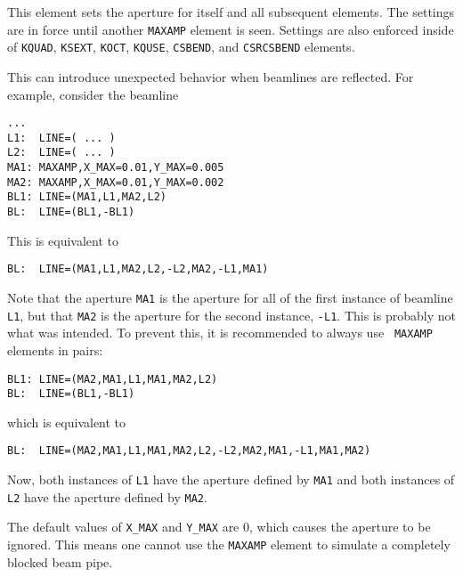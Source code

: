 This element sets the aperture for itself and all subsequent elements.
The settings are in force until another {\tt MAXAMP} element is seen.
Settings are also enforced inside of \verb|KQUAD|, \verb|KSEXT|, \verb|KOCT|, \verb|KQUSE|, \verb|CSBEND|, and \verb|CSRCSBEND| elements.

This can introduce unexpected behavior when beamlines are reflected.
For example, consider the beamline
\begin{verbatim}
...
L1:  LINE=( ... )
L2:  LINE=( ... )
MA1: MAXAMP,X_MAX=0.01,Y_MAX=0.005
MA2: MAXAMP,X_MAX=0.01,Y_MAX=0.002
BL1: LINE=(MA1,L1,MA2,L2)
BL:  LINE=(BL1,-BL1)
\end{verbatim}

This is equivalent to
\begin{verbatim}
BL:  LINE=(MA1,L1,MA2,L2,-L2,MA2,-L1,MA1)
\end{verbatim}
Note that the aperture {\tt MA1} is the aperture for all of the first
instance of beamline {\tt L1}, but that {\tt MA2} is the aperture for
the second instance, {\tt -L1}.  This is probably not what was
intended.  To prevent this, it is recommended to always use {\tt
MAXAMP} elements in pairs:
\begin{verbatim}
BL1: LINE=(MA2,MA1,L1,MA1,MA2,L2)
BL:  LINE=(BL1,-BL1)
\end{verbatim}
which is equivalent to
\begin{verbatim}
BL:  LINE=(MA2,MA1,L1,MA1,MA2,L2,-L2,MA2,MA1,-L1,MA1,MA2)
\end{verbatim}
Now, both instances of {\tt L1} have the aperture defined by 
{\tt MA1} and both instances of {\tt L2} have the aperture defined
by {\tt MA2}.

The default values of \verb|X_MAX| and \verb|Y_MAX| are 0, which causes the aperture to be ignored. This means one
cannot use the \verb|MAXAMP| element to simulate a completely blocked beam pipe.
